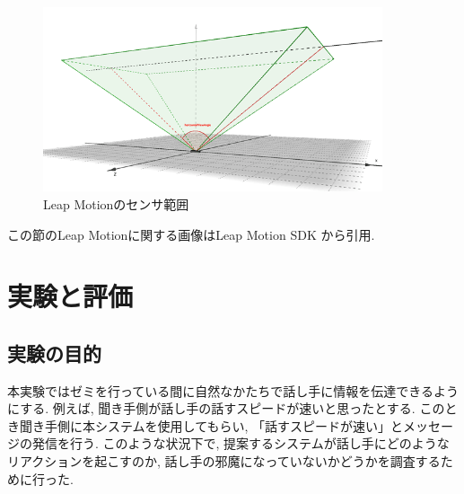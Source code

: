 \documentclass{funthesis}
\begin{document}
 \begin{figure}[H]
 \begin{center}
  \includegraphics[width=100mm]{./img/LeapAngle.png}
 \end{center}
 \caption{Leap Motionのセンサ範囲}
 \label{leap}
\end{figure}

この節のLeap Motionに関する画像はLeap Motion SDK から引用.





\chapter{実験と評価}

\section{実験の目的}
本実験ではゼミを行っている間に自然なかたちで話し手に情報を伝達できるようにする. 例えば,  聞き手側が話し手の話すスピードが速いと思ったとする. このとき聞き手側に本システムを使用してもらい, 「話すスピードが速い」とメッセージの発信を行う. このような状況下で, 提案するシステムが話し手にどのようなリアクションを起こすのか, 話し手の邪魔になっていないかどうかを調査するために行った. 
\end{document}

